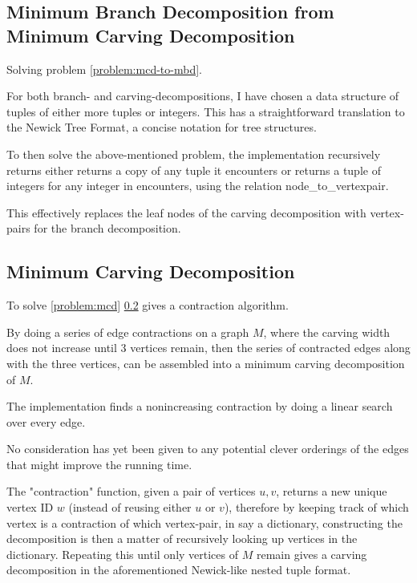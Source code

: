 \documentclass{article}
\begin{document}
	
	\subsection{Minimum Branch Decomposition from Minimum Carving Decomposition}

		Solving problem \ref{problem:mcd-to-mbd}.

		For both branch- and carving-decompositions, I have chosen a data structure of tuples of either more tuples or integers. This has a straightforward translation to the Newick Tree Format, a concise notation for tree structures.

		To then solve the above-mentioned problem, the implementation recursively returns either returns a copy of any tuple it encounters or returns a tuple of integers for any integer in encounters, using the relation node\_to\_vertexpair.

		This effectively replaces the leaf nodes of the carving decomposition with vertex-pairs for the branch decomposition.

			
	\subsection{Minimum Carving Decomposition}

		To solve \ref{problem:mcd} \ref{} gives a contraction algorithm.

		By doing a series of edge contractions on a graph $M$, where the carving width does not increase until 3 vertices remain, then the series of contracted edges along with the three vertices, can be assembled into a minimum carving decomposition of $M$.

		The implementation finds a nonincreasing contraction by doing a linear search over every edge.
		
		No consideration has yet been given to any potential clever orderings of the edges that might improve the running time.

		The "contraction" function, given a pair of vertices $u,v$, returns a new unique vertex ID $w$ (instead of reusing either $u$ or $v$), therefore by keeping track of which vertex is a contraction of which vertex-pair, in say a dictionary, constructing the decomposition is then a matter of recursively looking up vertices in the dictionary. Repeating this until only vertices of $M$ remain gives a carving decomposition in the aforementioned Newick-like nested tuple format.
\end{document}
